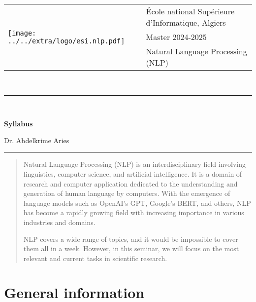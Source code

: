 \documentclass[11pt, a4paper]{article}
\begin{document}
\pagestyle{fancy}

\noindent
\begin{tabular}{ll}
\multirow{3}{*}{\texttt{[image: ../../extra/logo/esi.nlp.pdf]}} & \'Ecole national Supérieure d'Informatique, Algiers\\
& Master 2024-2025\\
& Natural Language Processing (NLP)
\end{tabular}\\[.25cm]
\noindent\rule{\textwidth}{1pt}\\[-0.25cm]
\begin{center}
{\LARGE \textbf{Syllabus}}
\begin{flushright}
	Dr. Abdelkrime Aries
\end{flushright}
\end{center}\vspace*{-0.25cm}
\noindent\rule{\textwidth}{1pt}

\begin{abstract}
	Natural Language Processing (NLP) is an interdisciplinary field involving linguistics, computer science, and artificial intelligence. 
	It is a domain of research and computer application dedicated to the understanding and generation of human language by computers. 
	With the emergence of language models such as OpenAI's GPT, Google's BERT, and others, NLP has become a rapidly growing field with increasing importance in various industries and domains.
	
	NLP covers a wide range of topics, and it would be impossible to cover them all in a week. 
	However, in this seminar, we will focus on the most relevant and current tasks in scientific research.
\end{abstract}

\section{General information}
\end{document}

